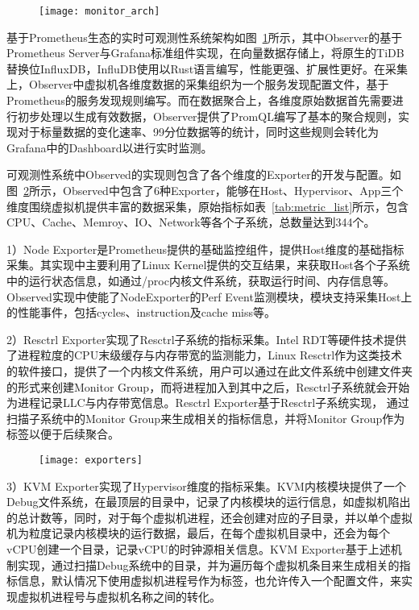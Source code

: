 \begin{figure}[!htbp]
    \centering
    \texttt{[image: monitor\_arch]}
    \label{fig:monitor_arch}
\end{figure}

基于Prometheus生态的实时可观测性系统架构如图~\ref{fig:monitor_arch}所示，其中Observer的基于Prometheus Server与Grafana标准组件实现，在向量数据存储上，将原生的TiDB替换位InfluxDB，InfluDB使用以Rust语言编写，性能更强、扩展性更好。在采集上，Observer中虚拟机各维度数据的采集组织为一个服务发现配置文件，基于Prometheus的服务发现规则编写。而在数据聚合上，各维度原始数据首先需要进行初步处理以生成有效数据，Observer提供了PromQL编写了基本的聚合规则，实现对于标量数据的变化速率、99分位数据等的统计，同时这些规则会转化为Grafana中的Dashboard以进行实时监测。

可观测性系统中Observed的实现则包含了各个维度的Exporter的开发与配置。如图~\ref{fig:exporters}所示，Observed中包含了6种Exporter，能够在Host、Hypervisor、App三个维度围绕虚拟机提供丰富的数据采集，原始指标如表~\ref{tab:metric_list}所示，包含CPU、Cache、Memroy、IO、Network等各个子系统，总数量达到344个。

1）Node Exporter是Prometheus提供的基础监控组件，提供Host维度的基础指标采集。其实现中主要利用了Linux Kernel提供的交互结果，来获取Host各个子系统中的运行状态信息，如通过/proc内核文件系统，获取运行时间、内存信息等。Observed实现中使能了NodeExporter的Perf Event监测模块，模块支持采集Host上的性能事件，包括cycles、instruction及cache miss等。

2）Resctrl Exporter实现了Resctrl子系统的指标采集。Intel RDT等硬件技术提供了进程粒度的CPU末级缓存与内存带宽的监测能力，Linux Resctrl作为这类技术的软件接口，提供了一个内核文件系统，用户可以通过在此文件系统中创建文件夹的形式来创建Monitor Group，而将进程加入到其中之后，Resctrl子系统就会开始为进程记录LLC与内存带宽信息。Resctrl Exporter基于Resctrl子系统实现， 通过扫描子系统中的Monitor Group来生成相关的指标信息，并将Monitor Group作为标签以便于后续聚合。

\begin{figure}[!htbp]
    \centering
    \texttt{[image: exporters]}
    \label{fig:exporters} 
\end{figure}

3）KVM Exporter实现了Hypervisor维度的指标采集。KVM内核模块提供了一个Debug文件系统，在最顶层的目录中，记录了内核模块的运行信息，如虚拟机陷出的总计数等，同时，对于每个虚拟机进程，还会创建对应的子目录，并以单个虚拟机为粒度记录内核模块的运行数据，最后，在每个虚拟机目录中，还会为每个vCPU创建一个目录，记录vCPU的时钟源相关信息。KVM Exporter基于上述机制实现，通过扫描Debug系统中的目录，并为遍历每个虚拟机条目来生成相关的指标信息，默认情况下使用虚拟机进程号作为标签，也允许传入一个配置文件，来实现虚拟机进程号与虚拟机名称之间的转化。

